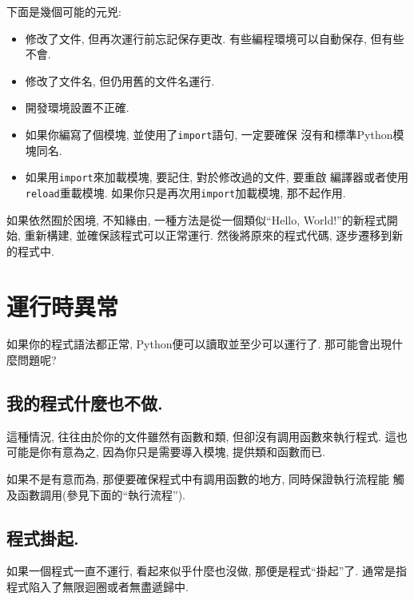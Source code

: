 \documentclass[10pt]{book}
\begin{document}
下面是幾個可能的元兇:

\begin{itemize}

\item 修改了文件, 但再次運行前忘記保存更改. 有些編程環境可以自動保存, 但有些不會. 

\item 修改了文件名, 但仍用舊的文件名運行. 

\item 開發環境設置不正確. 

\item 如果你編寫了個模塊, 並使用了{\tt import}語句, 一定要確保
沒有和標準Python模塊同名. 

\item 如果用{\tt import}來加載模塊, 要記住, 對於修改過的文件, 要重啟
編譯器或者使用{\tt reload}重載模塊. 
如果你只是再次用{\tt import}加載模塊, 那不起作用. 

\end{itemize}

如果依然囿於困境, 不知緣由, 
一種方法是從一個類似``Hello, World!''的新程式開始, 重新構建, 
並確保該程式可以正常運行. 
然後將原來的程式代碼, 逐步遷移到新的程式中. 


\section{運行時異常}

如果你的程式語法都正常, Python便可以讀取並至少可以運行了. 
那可能會出現什麼問題呢?


\subsection{我的程式什麼也不做.}

這種情況, 往往由於你的文件雖然有函數和類, 但卻沒有調用函數來執行程式. 
這也可能是你有意為之, 因為你只是需要導入模塊, 提供類和函數而已. 

如果不是有意而為, 那便要確保程式中有調用函數的地方, 同時保證執行流程能
觸及函數調用(參見下面的``執行流程''). 


\subsection{程式掛起.}

如果一個程式一直不運行, 看起來似乎什麼也沒做, 那便是程式``掛起''了. 
通常是指程式陷入了無限迴圈或者無盡遞歸中. 
\end{document}

